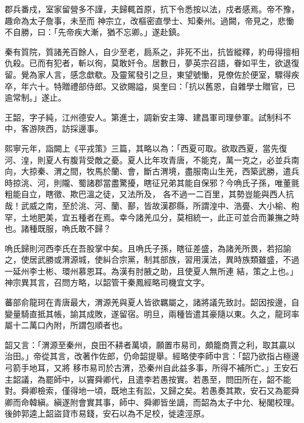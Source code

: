 \begin{pinyinscope}
 郡兵番戍，室家留營多不謹，夫歸輒首原，抗下令悉按以法，戍者感焉。帝不豫，趣命為太子詹事，未至而
 神宗立，改樞密直學士、知秦州。過闕，帝見之，悲慟不自勝，曰：「先帝疾大漸，猶不忘卿。」遂赴鎮。



 秦有質院，質諸羌百餘人，自少至老，扃系之，非死不出，抗皆縱釋，約毋得擅相仇殺。已而有犯者，斬以徇，莫敢奸令。居數日，夢英宗召語，眷如平生，欲退復留。覺為家人言，感念歔欷。及靈駕發引之旦，東望號慟，見僚佐於便室，驟得疾卒，年六十。特贈禮部侍郎。又欲賜謚，吳奎曰：「抗以舊恩，自雜學士贈官，已逾常制。」遂止。



 王韶，字子純，江州德安人。第進士，調新安主簿、建昌軍司理參軍。試制科不中，客游陜西，訪採邊事。



 熙寧元年，詣闕上《平戎策》三篇，其略以為：「西夏可取。欲取西夏，當先復河、湟，則夏人有腹背受敵之憂。夏人比年攻青唐，不能克，萬一克之，必並兵南向，大掠秦、渭之間，牧馬於蘭、會，斷古渭境，盡服南山生羌，西築武勝，遣兵時掠洮、河，則隴、蜀諸郡當盡驚擾，瞎征兄弟其能自保邪？今唃氏子孫，唯董氈粗能自立，瞎徵、欺巴溫之徒，又法所及，
 各不過一二百里，其勢豈能與西人抗哉！武威之南，至於洮、河、蘭、鄯，皆故漢郡縣，所謂湟中、浩亹、大小榆、枹罕，土地肥美，宜五種者在焉。幸今諸羌瓜分，莫相統一，此正可並合而兼撫之時也。諸種既服，唃氏敢不歸？



 唃氏歸則河西李氏在吾股掌中矣。且唃氏子孫，瞎征差盛，為諸羌所畏，若招諭之，使居武勝或渭源城，使糾合宗黨，制其部族，習用漢法，異時族類雖盛，不過一延州李士彬、環州慕恩耳。為漢有肘腋之助，且使夏人無所連
 結，策之上也。」神宗異其言，召問方略，以韶管干秦鳳經略司機宜文字。



 蕃部俞龍珂在青唐最大，渭源羌與夏人皆欲羈屬之，諸將議先致討。韶因按邊，自變量騎直抵其帳，諭其成敗，遂留宿。明旦，兩種皆遣其豪隨以東。久之，龍珂率屬十二萬口內附，所謂包順者也。



 韶又言：「渭源至秦州，良田不耕者萬頃，願置市易司，頗籠商賈之利，取其贏以治田。」帝從其言，改著作佐郎，仍命韶提舉。經略使李師中言：「韶乃欲指占極邊弓箭手地耳，又將
 移市易司於古渭，恐秦州自此益多事，所得不補所亡。」王安石主韶議，為罷師中，以竇舜卿代，且遣李若愚按實。若愚至，問田所在，韶不能對。舜卿檢索，僅得地一頃，既地主有訟，又歸之矣。若愚奏其欺，安石又為罷舜卿而命韓縝。縝遂附會實其事，師中、舜卿皆坐謫，而韶為太子中允、秘閣校理。後帥郭逵上韶盜貸市易錢，安石以為不足校，徙逵涇原。




\end{pinyinscope}
